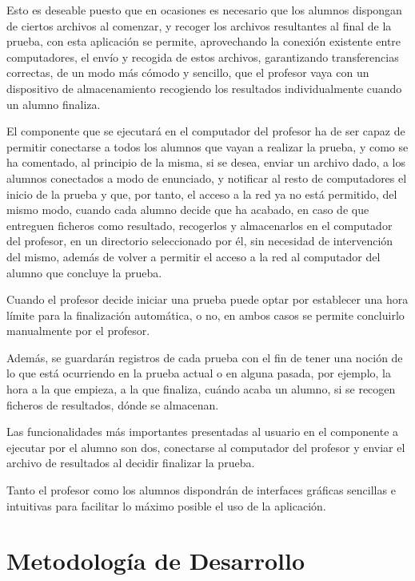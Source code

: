 Esto es deseable puesto que en ocasiones es necesario que los alumnos dispongan de ciertos archivos al comenzar, y recoger los archivos resultantes al final de la prueba, con esta aplicación se permite, aprovechando la conexión existente entre computadores, el envío y recogida de estos archivos, garantizando transferencias correctas, de un modo más cómodo y sencillo, que el profesor vaya con un dispositivo de almacenamiento recogiendo los resultados individualmente cuando un alumno finaliza.
\newline

El componente que se ejecutará en el computador del profesor ha de ser capaz de permitir conectarse a todos los alumnos que vayan a realizar la prueba, y como se ha comentado, al principio de la misma, si se desea, enviar un archivo dado, a los alumnos conectados a modo de enunciado, y notificar al resto de computadores el inicio de la prueba y que, por tanto, el acceso a la red ya no está permitido, del mismo modo, cuando cada alumno decide que ha acabado, en caso de que entreguen ficheros como resultado, recogerlos y almacenarlos en el computador del profesor, en un directorio seleccionado por él, sin necesidad de intervención del mismo, además de volver a permitir el acceso a la red al computador del alumno que concluye la prueba.
\newline

Cuando el profesor decide iniciar una prueba puede optar por establecer una hora límite para la finalización automática, o no, en ambos casos se permite concluirlo manualmente por el profesor.
\newline

Además, se guardarán registros de cada prueba con el fin de tener una noción de lo que está ocurriendo en la prueba actual o en alguna pasada, por ejemplo, la hora a la que empieza, a la que finaliza, cuándo acaba un alumno, si se recogen ficheros de resultados, dónde se almacenan.
\newline

Las funcionalidades más importantes presentadas al usuario en el componente a ejecutar por el alumno son dos, conectarse al computador del profesor y enviar el archivo de resultados al decidir finalizar la prueba.
\newline

Tanto el profesor como los alumnos dispondrán de interfaces gráficas sencillas e intuitivas para facilitar lo máximo posible el uso de la aplicación.


\section{Metodología de Desarrollo}
\label{sec:planificacion:metodologia}

